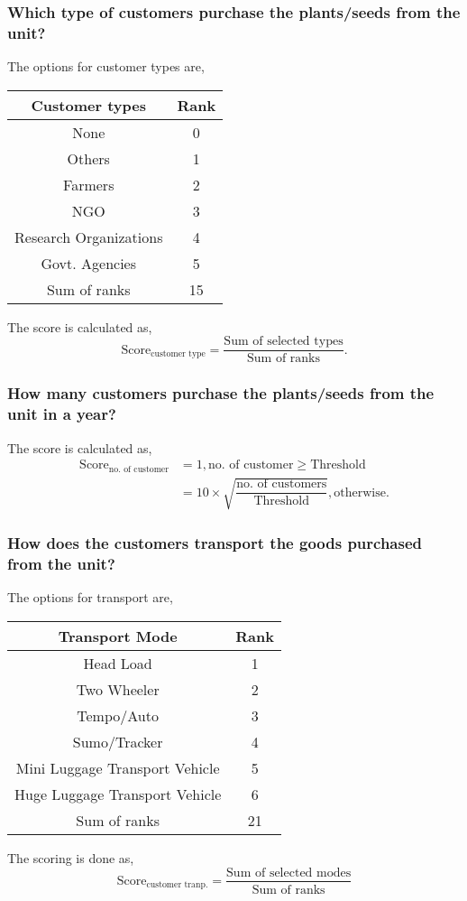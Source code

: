 \documentclass[oneside,twocolumn]{article}
\newcommand{\tsub}[2]{\text{#1}_{\text{#2}}}
\newcommand{\dsub}[2]{\dfrac{\text{#1}}{\text{#2}}}
\newenvironment{ttable}
               {
                 \begin{center}
                   \begin{tabular}{c|c}
                     \hline
               }
               {
                 \\ \hline
                   \end{tabular}
                 \end{center}
               }
\begin{document}
               \subsubsection{Which type of customers purchase the plants/seeds from the unit?}
               The options for customer types are,
               \begin{ttable}
                 Customer types & Rank \\ \hline
                 None & 0 \\
                 Others & 1 \\
                 Farmers & 2 \\
                 NGO & 3 \\
                 Research Organizations & 4 \\
                 Govt. Agencies & 5 \\ \hline
                 Sum of ranks & 15
               \end{ttable}
               The score is calculated as,
               \[
               \tsub{Score}{customer type} = \dsub{Sum of selected types}{Sum of ranks}.
               \]

               \subsubsection{How many customers purchase the plants/seeds from the unit in a year?}
               The score is calculated as,
               \begin{align*}
                 \tsub{Score}{no. of customer} &= 1, \text{no. of customer} \ge \text{Threshold} \\
                 &= 10 \times \sqrt{\dsub{no. of customers}{Threshold}}, \text{otherwise}.
               \end{align*}

               \subsubsection{How does the customers transport the goods purchased from the unit?}
               The options for transport are,
               \begin{ttable}
                 Transport Mode & Rank \\ \hline
                 Head Load & 1 \\
                 Two Wheeler & 2 \\
                 Tempo/Auto & 3 \\
                 Sumo/Tracker & 4 \\
                 Mini Luggage Transport Vehicle & 5 \\
                 Huge Luggage Transport Vehicle & 6 \\ \hline
                 Sum of ranks & 21
               \end{ttable}
               The scoring is done as,
               \[
               \tsub{Score}{customer tranp.} = \dsub{Sum of selected modes}{Sum of ranks}
               \]
               
\end{document}

